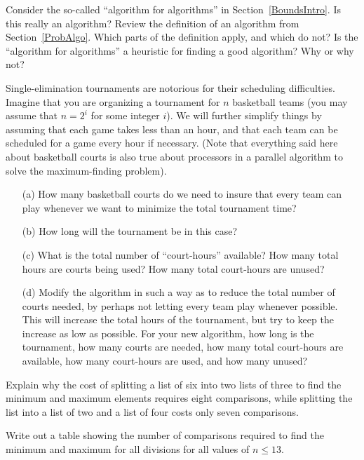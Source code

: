 \begin{exercises}

\item
Consider the so-called ``algorithm for algorithms'' in
Section~\ref{BoundsIntro}.
Is this really an algorithm?
Review the definition of an algorithm from
Section~\ref{ProbAlgo}.
Which parts of the definition apply, and which do not?
Is the ``algorithm for algorithms'' a heuristic for finding a good
algorithm? Why or why not?

\item
Single-elimination tournaments are notorious for their scheduling
difficulties.
Imagine that you are organizing a tournament for \(n\) basketball teams
(you may assume that \(n = 2^i\) for some integer \(i\)).
We will further simplify things by assuming that each game takes less
than an hour, and that each team can be scheduled for a game every
hour if necessary.
(Note that everything said here about basketball courts is also true
about processors in a parallel algorithm to solve the maximum-finding
problem).

\begin{enumerate}
\item[(a)] How many basketball courts do we need to insure that every
team can play whenever we want to minimize the total tournament time?
\item[(b)] How long will the tournament be in this case?
\item[(c)] What is the total number of ``court-hours'' available?
How many total hours are courts being used? How many total court-hours
are unused?
\item[(d)] Modify the algorithm in such a way as to reduce the total
number of courts needed, by perhaps not letting every team play
whenever possible.
This will increase the total hours of the tournament, but try to keep
the increase as low as possible.
For your new algorithm, how long is the tournament, how many courts
are needed, how many total court-hours are available, how many
court-hours are used, and how many unused?
\end{enumerate}

\item
Explain why the cost of splitting a list of six into two lists of
three to find the minimum and maximum elements requires eight
comparisons, while splitting the list into a list of two and a list of
four costs only seven comparisons.

\item
Write out a table showing the number of comparisons required to find
the minimum and maximum for all divisions for all values of
\(n \leq 13\).


\end{exercises}

